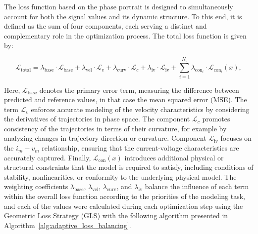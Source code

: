 \documentclass[11pt, oneside]{article}
\begin{document}
The loss function based on the phase portrait is designed to simultaneously account for both the  signal values and its dynamic structure. To this end, it is defined as the sum of four components, each serving a distinct and complementary role in the optimization process. The total loss function is given by:

\begin{equation}
    \mathcal{L}_{\mathrm{total}} = \lambda_{\mathrm{base}} \cdot \mathcal{L}_{\mathrm{base}} + \lambda_{\mathrm{vel}} \cdot \mathcal{L}_{v} + \lambda_{\mathrm{curv}} \cdot \mathcal{L}_{c} + \lambda_{\mathrm{iv}} \cdot \mathcal{L}_{\mathrm{iv}} +\sum^{N_c}_{i=1} \lambda_{\mathrm{con}_i} \cdot \mathcal{L}_{\mathrm{con}_i}(x),
    \label{eq:loss_function}
\end{equation}

Here, $\mathcal{L}_{\mathrm{base}}$ denotes the primary error term,  measuring the difference between predicted and reference values, in that case the mean squared error (MSE). The term $\mathcal{L}_{v}$ enforces accurate modeling of the velocity characteristics by considering the derivatives of trajectories in phase space. The component $\mathcal{L}_{c}$ promotes consistency of the trajectories in terms of their curvature, for example by analyzing changes in trajectory direction or curvature.
Component $\mathcal{L}_{\mathrm{iv}}$ focuses on the $i_m-v_m$ relationship, ensuring that the current-voltage characteristics are accurately captured. Finally, $\mathcal{L}_{\mathrm{con}}(x)$ introduces additional physical or structural constraints that the model is required to satisfy, including conditions of stability, nonlinearities, or conformity to the underlying physical model. The weighting coefficients $\lambda_{\mathrm{base}}$, $\lambda_{\mathrm{vel}}$, $\lambda_{\mathrm{curv}}$, and $\lambda_{\mathrm{iv}}$ balance the influence of each term within the overall loss function according to the priorities of the modeling task, and each of the values were calculated during each optimization step using the Geometric Loss Strategy (GLS) with the following algorithm presented in Algorithm~\ref{alg:adaptive_loss_balancing}.
\end{document}

